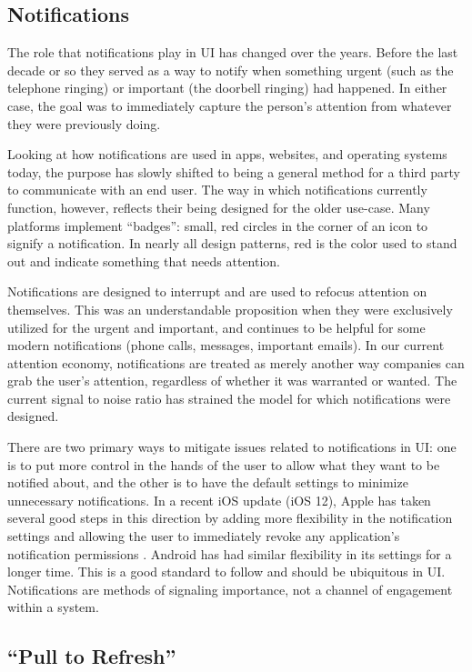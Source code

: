 \documentclass[12pt, oneside]{article}
\begin{document}
\subsection{Notifications}

The role that notifications play in UI has changed over the years. Before the last decade or so they served as a way to notify when something urgent (such as the telephone ringing) or important (the doorbell ringing) had happened. In either case, the goal was to immediately capture the person's attention from whatever they were previously doing.

Looking at how notifications are used in apps, websites, and operating systems today, the purpose has slowly shifted to being a general method for a third party to communicate with an end user. The way in which notifications currently function, however, reflects their being designed for the older use-case. Many platforms implement ``badges'': small, red circles in the corner of an icon to signify a notification. In nearly all design patterns, red is the color used to stand out and indicate something that needs attention.

Notifications are designed to interrupt and are used to refocus attention on themselves. This was an understandable proposition when they were exclusively utilized for the urgent and important, and continues to be helpful for some modern notifications (phone calls, messages, important emails). In our current attention economy, notifications are treated as merely another way companies can grab the user's attention, regardless of whether it was warranted or wanted. The current signal to noise ratio has strained the model for which notifications were designed.

There are two primary ways to mitigate issues related to notifications in UI: one is to put more control in the hands of the user to allow what they want to be notified about, and the other is to have the default settings to minimize unnecessary notifications. In a recent iOS update (iOS 12), Apple has taken several good steps in this direction by adding more flexibility in the notification settings and allowing the user to immediately revoke any application's notification permissions \cite{winkelman_2018}. Android has had similar flexibility in its settings for a longer time. This is a good standard to follow and should be ubiquitous in UI. Notifications are methods of signaling importance, not a channel of engagement within a system.

\subsection{``Pull to Refresh''}
\end{document}
